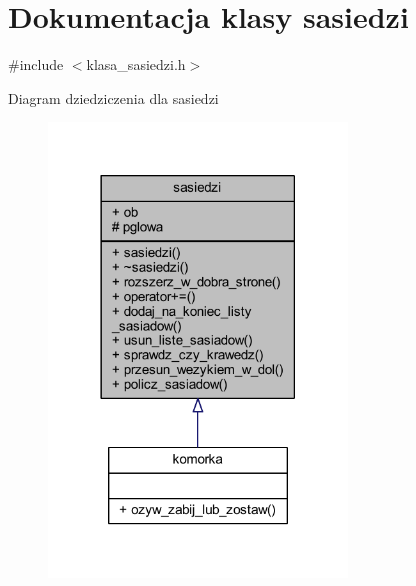 \hypertarget{classsasiedzi}{}\section{Dokumentacja klasy sasiedzi}
\label{classsasiedzi}


{\ttfamily \#include $<$klasa\+\_\+sasiedzi.\+h$>$}



Diagram dziedziczenia dla sasiedzi
\nopagebreak
\begin{figure}[H]
\begin{center}
\leavevmode
\includegraphics[width=225pt]{classsasiedzi__inherit__graph}
\end{center}
\end{figure}


